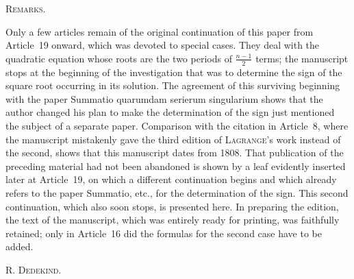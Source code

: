 \par\bigskip
{}
\begin{center}\textsc{Remarks.}\end{center}
\begingroup\small
Only a few articles remain of the original continuation of this paper from Article~19 onward, which was devoted to special cases. They deal with the quadratic equation whose roots are the two periods of $\frac{n-1}2$ terms; the manuscript stops at the beginning of the investigation that was to determine the sign of the square root occurring in its solution. The agreement of this surviving beginning with the paper Summatio quarumdam serierum singularium shows that the author changed his plan to make the determination of the sign just mentioned the subject of a separate paper. Comparison with the citation in Article~8, where the manuscript mistakenly gave the third edition of \textsc{Lagrange}'s work instead of the second, shows that this manuscript dates from 1808. That publication of the preceding material had not been abandoned is shown by a leaf evidently inserted later at Article~19, on which a different continuation begins and which already refers to the paper Summatio, etc., for the determination of the sign. This second continuation, which also soon stops, is presented here. In preparing the edition, the text of the manuscript, which was entirely ready for printing, was faithfully retained; only in Article~16 did the formulas for the second case have to be added.
\begin{flushright}R. \textsc{Dedekind}.\end{flushright}
\endgroup
{}
